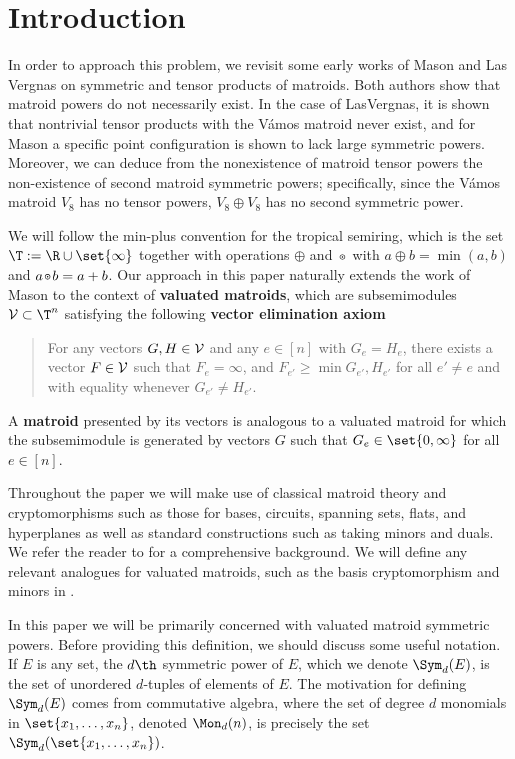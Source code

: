\section{Introduction}\label{sec:intro}


In order to approach this problem, we revisit some early works of Mason \cite{MGlueing} and Las Vergnas \cite{LV81} on symmetric and tensor products of matroids. Both authors show that matroid powers do not necessarily exist. In the case of LasVergnas, it is shown that nontrivial tensor products with the V\'amos matroid never exist, and for Mason a specific point configuration is shown to lack large symmetric powers. Moreover, we can deduce from the nonexistence of matroid tensor powers the non-existence of second matroid symmetric powers; specifically, since the V\'amos matroid $V_8$ has no tensor powers, $V_8\oplus V_8$ has no second symmetric power.

We will follow the min-plus convention for the tropical semiring, which is the set $\T:= \R\cup \set{\infty}$ together with operations $\oplus$ and $\ttimes$ with $a\oplus b= \min(a,b)$ and $a\ttimes b = a+b$. Our approach in this paper naturally extends the work of Mason to the context of \textbf{valuated matroids}, which are subsemimodules $\sV\subset \T^n$ satisfying the following \textbf{vector elimination axiom}
    \begin{quote}
        For any vectors $G,H\in \mathcal{V}$ and any $e\in [n]$ with $G_e=H_e$, there exists a vector $F\in \mathcal{V}$ such that $F_e=\infty$, and $F_{e'}\geq\min{G_{e'},H_{e'}}$ for all $e'\neq e$ and with equality whenever $G_{e'}\neq H_{e'}$.
    \end{quote}
A \textbf{matroid} presented by its vectors is analogous to a valuated matroid for which the subsemimodule is generated by vectors $G$ such that $G_e\in \set{0,\infty}$ for all $e\in [n]$.

Throughout the paper we will make use of classical matroid theory and cryptomorphisms such as those for bases, circuits, spanning sets, flats, and hyperplanes as well as standard constructions such as taking minors and duals. We refer the reader to \cite{Oxley06} for a comprehensive background. We will define any relevant analogues for valuated matroids, such as the basis cryptomorphism and minors in .

In this paper we will be primarily concerned with valuated matroid symmetric powers. Before providing this definition, we should discuss some useful notation. If $E$ is any set, the $d\th$ symmetric power of $E$, which we denote $\Sym_d(E)$, is the set of unordered $d$-tuples of elements of $E$. The motivation for defining $\Sym_d(E)$ comes from commutative algebra, where the set of degree $d$ monomials in $\set{x_1,\dots,x_n}$, denoted $\Mon_d(n)$, is precisely the set $\Sym_d(\set{x_1,\dots,x_n})$.

